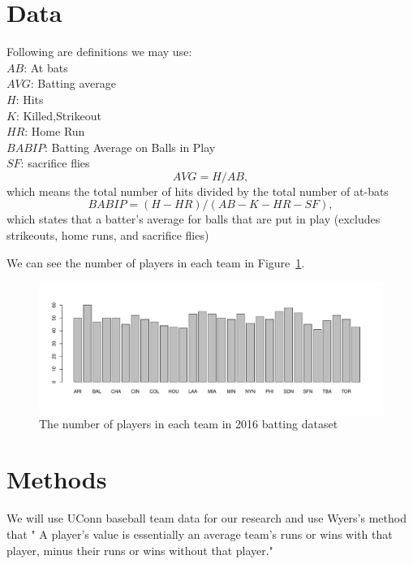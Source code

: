 \documentclass[12pt]{article}
\begin{document}
\section{Data}
\label{sec:data}
Following are definitions we may use:\\
$AB$: At bats\\ 
$AVG$: Batting average\\ 
$H$: Hits\\
$K$: Killed,Strikeout \\
$HR$: Home Run\\
$BABIP$: Batting Average on Balls in Play\\
$SF$: sacrifice flies\\
\begin{equation}
  \label{eq:AVG}
  AVG = H/AB,
\end{equation}
which means the total number of hits divided by the total number of at-bats
\begin{equation}
  \label{eq:BABIP}
  BABIP = (H - HR) / (AB - K - HR - SF),
\end{equation}
which states that a batter's average for balls that are put in play (excludes strikeouts, home runs, and sacrifice flies)


We can see the number of players in each team in Figure~\ref{fig:team}.
\graphicspath{{images/}}

\begin{figure}[tbp]
  \centering
  \includegraphics[width=\textwidth]{baseball team.pdf}
  \caption{The number of players in each team in 2016 batting dataset}
  \label{fig:team}
\end{figure}

\section{Methods}
\label{sec:meth}
We will use UConn baseball team data for our research and use Wyers's method \citet*{web:Wyers:Part2} that "
A player's value is essentially an average team's runs or wins with that player, minus their runs or wins without 
that player."
\end{document}
